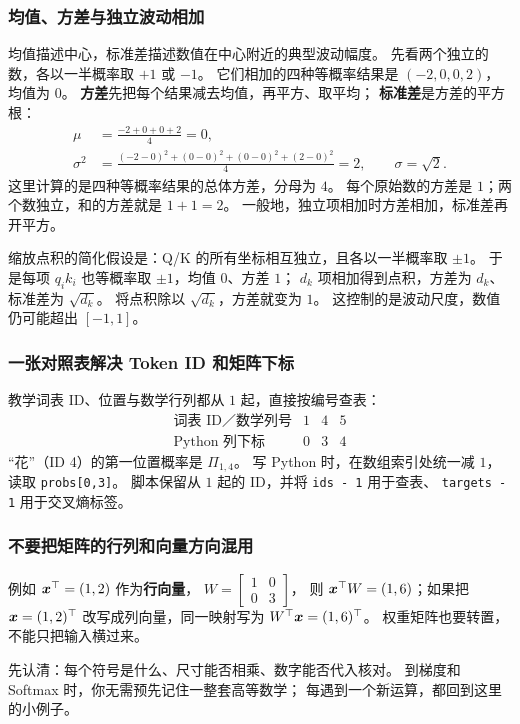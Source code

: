 \subsubsection*{均值、方差与独立波动相加}
\label{app:variance-scaling}

均值描述中心，标准差描述数值在中心附近的典型波动幅度。
先看两个独立的数，各以一半概率取 $+1$ 或 $-1$。
它们相加的四种等概率结果是 $(-2,0,0,2)$，均值为 $0$。
\textbf{方差}先把每个结果减去均值，再平方、取平均；
\textbf{标准差}是方差的平方根：
\[
\begin{aligned}
\mu&=\frac{-2+0+0+2}{4}=0,\\
\sigma^2&=\frac{(-2-0)^2+(0-0)^2+(0-0)^2+(2-0)^2}{4}=2,
\qquad \sigma=\sqrt2.
\end{aligned}
\]
这里计算的是四种等概率结果的总体方差，分母为 $4$。
每个原始数的方差是 $1$；两个数独立，和的方差就是 $1+1=2$。
一般地，独立项相加时方差相加，标准差再开平方。

缩放点积的简化假设是：Q/K 的所有坐标相互独立，且各以一半概率取 $\pm1$。
于是每项 $q_i k_i$ 也等概率取 $\pm1$，均值 $0$、方差 $1$；
$d_k$ 项相加得到点积，方差为 $d_k$、标准差为 $\sqrt{d_k}$。
将点积除以 $\sqrt{d_k}$，方差就变为 $1$。
这控制的是波动尺度，数值仍可能超出 $[-1,1]$。

\subsubsection*{一张对照表解决 Token ID 和矩阵下标}

教学词表 ID、位置与数学行列都从 $1$ 起，直接按编号查表：
\[
\begin{array}{c|ccc}
\text{词表 ID／数学列号} & 1 & 4 & 5\\\hline
\text{Python 列下标} & 0 & 3 & 4
\end{array}
\]
“花”（ID 4）的第一位置概率是 $\Pi_{1,4}$。
写 Python 时，在数组索引处统一减 $1$，读取 \texttt{probs[0,3]}。
脚本保留从 $1$ 起的 ID，并将 \texttt{ids - 1} 用于查表、
\texttt{targets - 1} 用于交叉熵标签。

\subsubsection*{不要把矩阵的行列和向量方向混用}

例如 $\boldsymbol{x}^\top=(1,2)$ 作为\textbf{行向量}，
$W=\begin{bmatrix}1&0\\0&3\end{bmatrix}$，
则 $\boldsymbol{x}^\top W=(1,6)$；如果把
$\boldsymbol{x}=(1,2)^\top$ 改写成列向量，同一映射写为
$W^\top\boldsymbol{x}=(1,6)^\top$。
权重矩阵也要转置，不能只把输入横过来。


\par\smallskip
先认清：每个符号是什么、尺寸能否相乘、数字能否代入核对。
到梯度和 Softmax 时，你无需预先记住一整套高等数学；
每遇到一个新运算，都回到这里的小例子。
